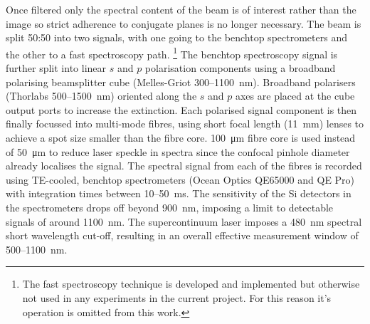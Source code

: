 \documentclass{article}
\begin{document}

Once filtered only the spectral content of the beam is of interest rather than the image so strict adherence to conjugate planes is no longer necessary. The beam is split 50:50 into two signals, with one going to the benchtop spectrometers and the other to a fast spectroscopy path.%
\footnote{The fast spectroscopy technique is developed and implemented but otherwise not used in any experiments in the current project. For this reason it's operation is omitted from this work.}
The benchtop spectroscopy signal is further split into linear $s$ and $p$ polarisation components using a broadband polarising beamsplitter cube (Melles-Griot 300--\SI{1100}{nm}). Broadband polarisers (Thorlabs 500--\SI{1500}{nm}) oriented along the $s$ and $p$ axes are placed at the cube output ports to increase the extinction. Each polarised signal component is then finally focussed into multi-mode fibres, using short focal length (\SI{11}{mm}) lenses to achieve a spot size smaller than the fibre core. \SI{100}{\micro\metre} fibre core is used instead of \SI{50}{\micro\metre} to reduce laser speckle in spectra since the confocal pinhole diameter already localises the signal.
The spectral signal from each of the fibres is recorded using TE-cooled, benchtop spectrometers (Ocean Optics QE65000 and QE Pro) with integration times between 10--\SI{50}{ms}. The sensitivity of the Si detectors in the spectrometers drops off beyond \SI{900}{nm}, imposing a limit to detectable signals of around \SI{1100}{nm}. The supercontinuum laser imposes a \SI{480}{nm} spectral short wavelength cut-off, resulting in an overall effective measurement window of 500--\SI{1100}{nm}.
\end{document}
